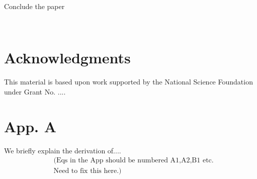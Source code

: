 \documentclass[prl,aps,reprint,noshowpacs,superscriptaddress,floatfix,letterpaper,longbibliography]{revtex4-2}
\begin{document}
Conclude the paper

\lipsum[2-3]
\\ 


\section{Acknowledgments}
\begin{acknowledgments}
This material is based upon work supported by the National Science Foundation under Grant No. ....

\end{acknowledgments}

 

\appendix

\section{App. A}
\label{AppAT} 
We briefly explain the derivation of.... 
\begin{align}
    &(\text{Eqs in the App should be numbered A1,A2,B1 etc.}\nonumber\\ 
    &\text{Need to fix this here.)}
\end{align}
\end{document}
